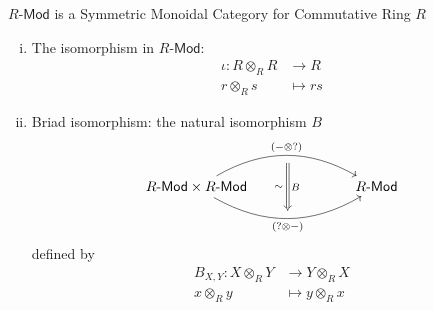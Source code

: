 \begin{proposition}{$R\text{-}\mathsf{Mod}$ is a Symmetric Monoidal Category for Commutative Ring $R$}{}
\begin{enumerate}[(i)]
        \item The isomorphism in $R\text{-}\mathsf{Mod}$: 
        \begin{align*}
            \iota:R\otimes_R R &\longrightarrow R\\
            r\otimes_R s&\longmapsto rs
        \end{align*}
        \item Briad isomorphism: the natural isomorphism $B$
        \[
            \begin{tikzcd}[ampersand replacement=\&]
                R\text{-}\mathsf{Mod}\times R\text{-}\mathsf{Mod} \arrow[r, "(-\otimes ?)"{name=A, above}, bend left] \arrow[r, "(? \otimes-)"'{name=B, below}, bend right] \&[+45pt] R\text{-}\mathsf{Mod}
                \arrow[Rightarrow, shorten <=5.5pt, shorten >=5.5pt, from=A.south-|B, to=B, "B", "\sim\hspace{1pt}"']
            \end{tikzcd}
        \]
        defined by
        \begin{align*}
            B_{X,Y}:X\otimes_R Y&\longrightarrow Y\otimes_R X\\
            x\otimes_R y&\longmapsto y\otimes_R x
        \end{align*}
    \end{enumerate}
\end{proposition}
